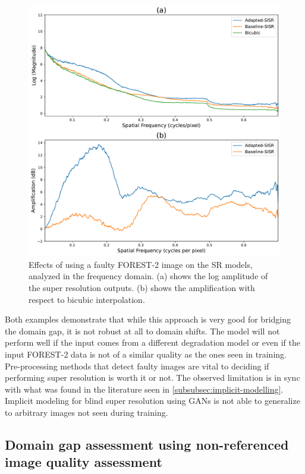          \begin{figure}[H]
        \centering
        \includegraphics[scale= 0.38]{Includes/5-target-prediction-with-domain-gap-from-forest-fft.pdf}
        \caption{\small{Effects of using a faulty FOREST-2 image on the SR models, analyzed in the frequency domain. (a) shows the log amplitude of the super resolution outputs. (b) shows the amplification with respect to bicubic interpolation.}}
        \label{fig:5-target-prediction-with-domain-gap-from-forest-fft.pdf}
    \end{figure}
    
    Both examples demonstrate that while this approach is very good for bridging the domain gap, it is not robust at all to domain shifts. The model will not perform well if the input comes from a different degradation model or even if the input FOREST-2 data is not of a similar quality as the ones seen in training. Pre-processing methods that detect faulty images are vital to deciding if performing super resolution is worth it or not. 
    The observed limitation is in sync with what was found in the literature seen in \ref{subsubsec:implicit-modelling}. Implicit modeling for blind super resolution using GANs is not able to generalize to arbitrary images not seen during training.

    \subsection{Domain gap assessment using non-referenced image quality assessment}

